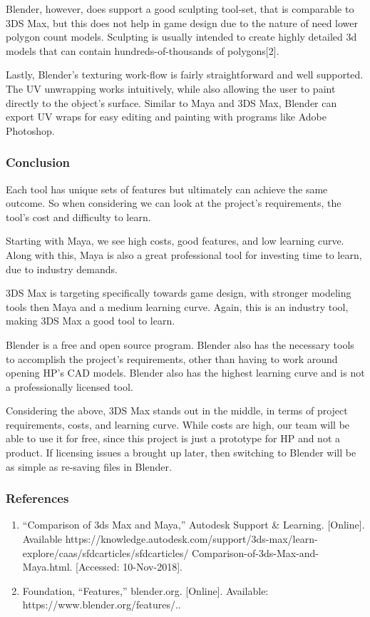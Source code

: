 \documentclass[onecolumn, draftclsnofoot,10pt, compsoc]{IEEEtran}
\begin{document}
Blender, however, does support a good sculpting tool-set, that is comparable to 3DS Max, but this does not help in game design due to the nature of need lower polygon count models. Sculpting is usually intended to create highly detailed 3d models that can contain hundreds-of-thousands of polygons[2]. 

Lastly, Blender’s texturing work-flow is fairly straightforward and well supported. The UV unwrapping works intuitively, while also allowing the user to paint directly to the object’s surface. Similar to Maya and 3DS Max, Blender can export UV wraps for easy editing and painting with programs like Adobe Photoshop.

\subsubsection{Conclusion}
Each tool has unique sets of features but ultimately can achieve the same outcome. So when considering we can look at the project's requirements, the tool’s cost and difficulty to learn. 

Starting with Maya, we see high costs, good features, and low learning curve. Along with this, Maya is also a great professional tool for investing time to learn, due to industry demands. 

3DS Max is targeting specifically towards game design, with stronger modeling tools then Maya and a medium learning curve. Again, this is an industry tool, making 3DS Max a good tool to learn. 

Blender is a free and open source program. Blender also has the necessary tools to accomplish the project's requirements, other than having to work around opening HP’s CAD models. Blender also has the highest learning curve and is not a professionally licensed tool. 

Considering the above, 3DS Max stands out in the middle, in terms of project requirements, costs, and learning curve. While costs are high, our team will be able to use it for free, since this project is just a prototype for HP and not a product. If licensing issues a brought up later, then switching to Blender will be as simple as re-saving files in Blender.

\subsubsection{References}
\begin{enumerate}
    \item “Comparison of 3ds Max and Maya,” Autodesk Support \& Learning. [Online]. Available\newline
    https://knowledge.autodesk.com/support/3ds-max/learn-explore/caas/sfdcarticles/sfdcarticles/\newline
    Comparison-of-3ds-Max-and-Maya.html. [Accessed: 10-Nov-2018].
    \item  Foundation, “Features,” blender.org. [Online]. Available: https://www.blender.org/features/..
\end{enumerate}
\end{document}

